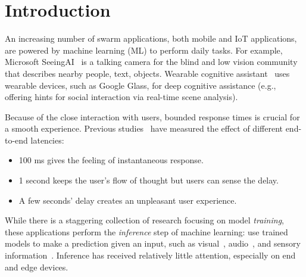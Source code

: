 \section{Introduction}
\label{sec:introduction}

An increasing number of swarm applications, both mobile and IoT applications,
are powered by machine learning (ML) to perform daily tasks. For example,
Microsoft SeeingAI~\cite{seeingai} is a talking camera for the blind and low
vision community that describes nearby people, text, objects. Wearable cognitive
assistant~\cite{ha2014towards} uses wearable devices, such as Google Glass, for
deep cognitive assistance (e.g., offering hints for social interaction via
real-time scene analysis).

Because of the close interaction with users, bounded response times is crucial
for a smooth experience. Previous studies~\cite{nielsen1994usability,
  schneiderman1998designing} have measured the effect of different end-to-end
latencies:

\begin{itemize}
\item 100 ms gives the feeling of instantaneous response.
\item 1 second keeps the user's flow of thought but users can sense the delay.
\item A few seconds' delay creates an unpleasant user experience.
\end{itemize}

While there is a staggering collection of research focusing on model
\textit{training}, these applications perform the \textit{inference} step of
machine learning: use trained models to make a prediction given an input, such
as visual~\cite{googlelens, ha2014towards, seeingai}, audio~\cite{alexa,
  applesiri, cortana}, and sensory information~\cite{laput2017synthetic,
  lu2010jigsaw}. Inference has received relatively little attention, especially
on end and edge devices.



